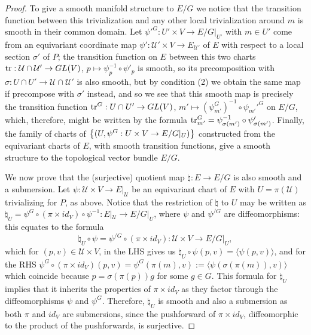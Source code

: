 \begin{proof}
To give a smooth manifold structure to $E/G$ we notice that the transition function between this trivialization and any other local trivialization around $m$ is smooth in their common domain. Let $\psi'^G:U' \times V \to E/G|_{U'}$ with $m \in U'$ come from an equivariant coordinate map $\psi': \mathcal U' \times V \to E_{\mathcal U'}$ of $E$ with respect to a local section $\sigma'$ of $P$; the transition function on $E$ between this two charts $\operatorname{tr}: \mathcal U \cap \mathcal U' \to GL(V)$, $p \mapsto \psi^{-1}_p \circ \psi'_p$ is smooth, so its precomposition with $\sigma: U \cap U' \to \mathcal U \cap \mathcal U'$ is also smooth, but by condition (2) we obtain the same map if precompose with $\sigma'$ instead, and so we see that this smooth map is precisely the transition function $\operatorname{tr}^{G}: U \cap U' \to GL(V)$, $m' \mapsto (\psi_{m'}^{G})^{-1} \circ \psi_{m'}'^G$  on $E/G$, which, therefore, might be written by the formula $\operatorname{tr}^G_{m'} = \psi^{-1}_{\sigma(m')} \circ \psi'_{\sigma(m')}$. Finally, the family of charts of $\left\{ (U, \psi^{G}:U \times V \to E/G|_U) \right\}$ constructed from the equivariant charts of $E$, with smooth transition functions, give a smooth structure to the topological vector bundle $E/G$.

We now prove that the (surjective) quotient map $\natural : E \to E/G$ is also smooth and a submersion. Let $\psi: \mathcal U \times V \to E|_{\mathcal U}$ be an equivariant chart of $E$ with $U = \pi(\mathcal U)$ trivializing for $P$, as above. Notice that the restriction of $\natural$ to $U$ may be written as $\natural_U = \psi^{G} \circ (\pi \times id_V) \circ \psi^{-1}: E|_{\mathcal U} \to E/G|_U$, where $\psi$ and $\psi^{/G}$ are diffeomorphisms: this equates to the formula \[\natural_U \circ \psi = \psi^{/G} \circ (\pi \times id_V): \mathcal U \times V \to E/G|_U,\] which for $(p, v) \in \mathcal U \times V$, in the LHS gives us $\natural_U \circ \psi(p, v) = \langle\psi(p, v)\rangle$, and for the RHS $\psi^{G} \circ (\pi \times id_V) (p, v) = \psi^{G}(\pi(m), v) := \langle\psi(\sigma(\pi(m)), v)\rangle$ which coincide because $p = \sigma(\pi(p))g$ for some $g \in G$. This formula for $\natural_U$ implies that it inherits the properties of $\pi \times id_V$ as they factor through the diffeomorphisms $\psi$ and $\psi^G$. Therefore, $\natural_U$ is smooth and also a submersion as both $\pi$ and $id_V$ are submersions, since the pushforward of $\pi \times id_V$, diffeomorphic to the product of the pushforwards, is surjective.


\end{proof}
